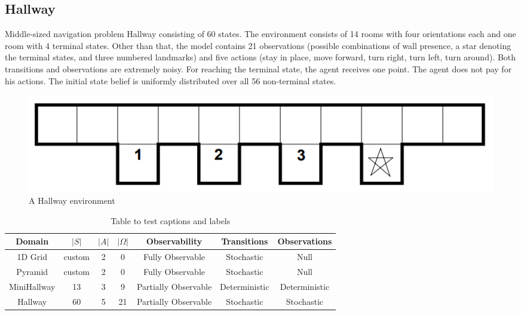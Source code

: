 \subsection{Hallway}

Middle-sized navigation problem Hallway \cite{Littman} consisting of 60 states. The environment consists of 14 rooms with four orientations each and one room with 4 terminal states. Other than that, the model contains 21 observations (possible combinations of wall presence, a star denoting the terminal states, and three numbered landmarks) and five actions (stay in place, move forward, turn right, turn left, turn around). Both transitions and observations are extremely noisy. For reaching the terminal state, the agent receives one point. The agent does not pay for his actions. The initial state belief is uniformly distributed over all 56 non-terminal states.

\begin{figure}[ht]
\caption{A Hallway environment}
\centering
\includegraphics[scale=0.5]{pictures/hallway.png}
\end{figure}








\begin{table}[ht]
\centering
\begin{tabular}{||c c c c c c c||} 
 \hline
 Domain & $|S|$ & $|A|$ & $|\Omega|$ & Observability & Transitions & Observations \\
 \hline\hline
 1D Grid & custom & 2 & 0 & Fully Observable & Stochastic & Null \\
 Pyramid & custom & 2 & 0 & Fully Observable & Stochastic & Null \\
 MiniHallway & 13 & 3 & 9 & Partially Observable & Deterministic & Deterministic \\
 Hallway & 60 & 5 & 21 & Partially Observable & Stochastic & Stochastic \\
 \hline
\end{tabular}
\caption{Table to test captions and labels}
\label{TODO1}
\end{table}



